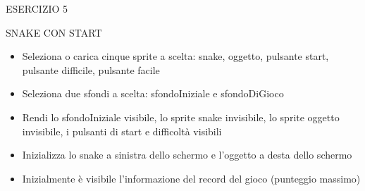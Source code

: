 \documentclass[aspectratio=1610]{beamer}
\begin{document}
\begin{frame}{ESERCIZIO 5}
    \begin{alertblock}{SNAKE CON START}
        \begin{minipage}{0.96\linewidth}
            \begin{itemize}
                \justifying
                \item Seleziona o carica cinque sprite a scelta: snake, oggetto, pulsante start, pulsante difficile, pulsante facile
                \pause
                \item Seleziona due sfondi a scelta: sfondoIniziale e sfondoDiGioco
                \pause
                \item Rendi lo sfondoIniziale visibile, lo sprite snake invisibile, lo sprite oggetto invisibile, i pulsanti di start e difficoltà visibili
                \pause
                \item Inizializza lo snake a sinistra dello schermo e l'oggetto a desta dello schermo
                \pause
                \item Inizialmente è visibile l'informazione del record del gioco (punteggio massimo)
            \end{itemize}
        \end{minipage}
    \end{alertblock}
\end{frame}
\end{document}

